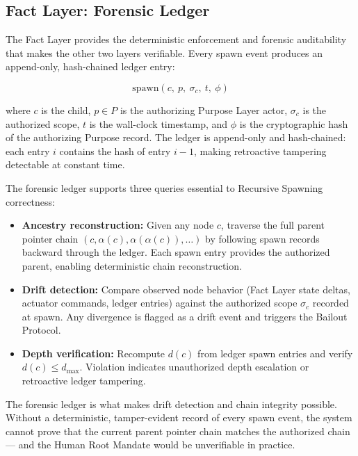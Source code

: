 \subsection{Fact Layer: Forensic Ledger}
\label{sec:fact-ledger}

The Fact Layer provides the deterministic enforcement and forensic auditability that makes the other two layers verifiable. Every spawn event produces an append-only, hash-chained ledger entry:

\begin{equation}
\text{spawn}(c,\ p,\ \sigma_c,\ t,\ \phi)
\tag{3}
\end{equation}

where $c$ is the child, $p \in P$ is the authorizing Purpose Layer actor, $\sigma_c$ is the authorized scope, $t$ is the wall-clock timestamp, and $\phi$ is the cryptographic hash of the authorizing Purpose record. The ledger is append-only and hash-chained: each entry $i$ contains the hash of entry $i-1$, making retroactive tampering detectable at constant time.

The forensic ledger supports three queries essential to Recursive Spawning correctness:

\begin{itemize}
    \itemsep0em
    \item \textbf{Ancestry reconstruction:} Given any node $c$, traverse the full parent pointer chain $(c, \alpha(c), \alpha(\alpha(c)), \ldots)$ by following spawn records backward through the ledger. Each spawn entry provides the authorized parent, enabling deterministic chain reconstruction.
    \item \textbf{Drift detection:} Compare observed node behavior (Fact Layer state deltas, actuator commands, ledger entries) against the authorized scope $\sigma_c$ recorded at spawn. Any divergence is flagged as a drift event and triggers the Bailout Protocol.
    \item \textbf{Depth verification:} Recompute $d(c)$ from ledger spawn entries and verify $d(c) \leq d_{\max}$. Violation indicates unauthorized depth escalation or retroactive ledger tampering.
\end{itemize}

The forensic ledger is what makes drift detection and chain integrity possible. Without a deterministic, tamper-evident record of every spawn event, the system cannot prove that the current parent pointer chain matches the authorized chain — and the Human Root Mandate would be unverifiable in practice.


